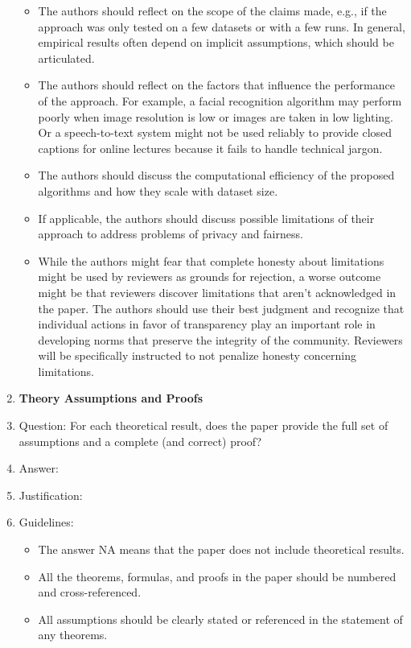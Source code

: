 \documentclass{article}
\begin{document}
\begin{enumerate}
\begin{itemize}
            \item The authors should reflect on the scope of the claims made, e.g., if the approach was only tested on a few datasets or with a few runs. In general, empirical results often depend on implicit assumptions, which should be articulated.
            \item The authors should reflect on the factors that influence the performance of the approach. For example, a facial recognition algorithm may perform poorly when image resolution is low or images are taken in low lighting. Or a speech-to-text system might not be used reliably to provide closed captions for online lectures because it fails to handle technical jargon.
            \item The authors should discuss the computational efficiency of the proposed algorithms and how they scale with dataset size.
            \item If applicable, the authors should discuss possible limitations of their approach to address problems of privacy and fairness.
            \item While the authors might fear that complete honesty about limitations might be used by reviewers as grounds for rejection, a worse outcome might be that reviewers discover limitations that aren't acknowledged in the paper. The authors should use their best judgment and recognize that individual actions in favor of transparency play an important role in developing norms that preserve the integrity of the community. Reviewers will be specifically instructed to not penalize honesty concerning limitations.
        \end{itemize}
    \item {\bf Theory Assumptions and Proofs}
    \item[] Question: For each theoretical result, does the paper provide the full set of assumptions and a complete (and correct) proof?
    \item[] Answer: \answerTODO{} %
    \item[] Justification: \justificationTODO{}
    \item[] Guidelines:
        \begin{itemize}
            \item The answer NA means that the paper does not include theoretical results.
            \item All the theorems, formulas, and proofs in the paper should be numbered and cross-referenced.
            \item All assumptions should be clearly stated or referenced in the statement of any theorems.

\end{itemize}
\end{enumerate}
\end{document}

